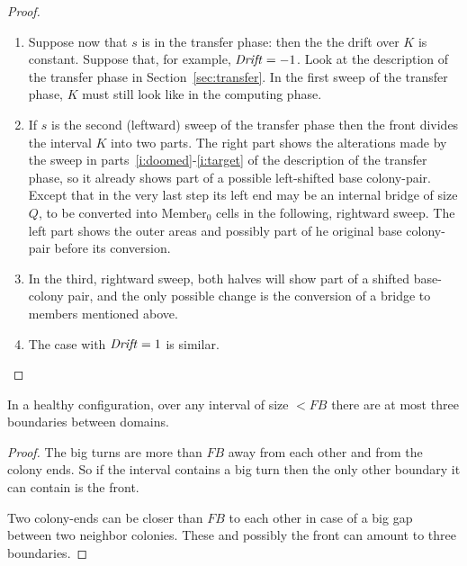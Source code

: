 \documentclass[11pt]{memoir}
\theoremstyle{definition} %
\newtheorem{Premark}{\color{cyan}Peter remark}
\newenvironment{premark}{\begin{Premark}\color{cyan}}{\varqed\end{Premark}}
\newcommand{\fld}[1]{\ensuremath{\textit{#1\/}}}
\def\B{B}
\newcommand{\F}{F}
\newcommand{\Q}{Q} %
\newcommand{\Drift}{\fld{Drift}}
\newcommand{\Member}{\mathrm{Member}}
\begin{document}
\begin{proof}
\begin{enumerate}
\item Suppose now that \( s \) is in the transfer phase: then the 
  the drift over \( K \) is constant.
  Suppose that, for example, \( \Drift=-1 \).
  Look at the description of the transfer phase in Section~\ref{sec:transfer}.
 In the first sweep of the transfer phase, \( K \) must still look like in the computing phase.

\item   If  \( s \) is the second (leftward) sweep of the transfer phase
  then the front divides the interval \( K \) into two parts.
  The right part shows the alterations made by the sweep
  in parts~\ref{i:doomed}-\ref{i:target} of the description of the transfer phase,
  so it already shows part of a possible left-shifted base colony-pair.
  Except that in the very last step its left end may be an internal bridge of size \( \Q \),
  to be converted into \( \Member_{0} \) cells in the following, rightward sweep.
  The left part shows the outer areas and possibly part of he original base colony-pair before its conversion.

\item In the third, rightward sweep, both halves will show part of a shifted base-colony pair,
  and the only possible change is the conversion of a bridge to members mentioned above.

  \item The case with \( \Drift=1 \) is similar.
  \end{enumerate}
\end{proof}


\begin{lemma}\label{lem:3-boundaries}
  In a healthy configuration, over any interval of size \( <\F\B \) there are at most three boundaries between
  domains.
\end{lemma}
\begin{proof}
  The big turns are more than \( \F\B \) away from each other and from the colony ends.
  So if the interval contains a big turn then the only other boundary it can contain is the front.

  Two colony-ends can be closer than \( \F\B \) to each other in case of a big gap between
  two neighbor colonies.
  These and possibly the front can amount to three boundaries.
\end{proof}
\end{document}
